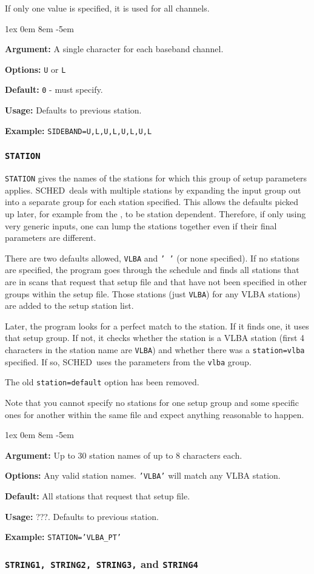 \documentclass{report}
\newcommand{\schedb}{{\sc SCHED~}}
\newcommand{\rcwbox}[5]{
  \begin{list}{}{\parsep 1ex  \itemsep 0em
                 \leftmargin 8em  \itemindent -5em }
    \item {\bf Argument:} #1
    \item {\bf Options:}  #2
    \item {\bf Default:}  #3
    \item {\bf Usage:}    #4
    \item {\bf Example:}  #5
  \end{list}
}
\begin{document}
If only one value is specified, it is used for all channels.

\rcwbox
{A single character for each baseband channel.}
{{\tt U} or {\tt L}}
{{\tt 0} - must specify.}
{Defaults to previous station.}
{{\tt SIDEBAND=U,L,U,L,U,L,U,L}}


\subsubsection{\label{SP:STATION}{\tt STATION}}

{\tt STATION} gives the names of the stations for which this group of
setup parameters applies.  \schedb deals with multiple stations by
expanding the input group out into a separate group for each
station specified.  This allows the defaults picked up later, for
example from the , to be station
dependent.  Therefore, if only using very generic inputs, one can
lump the stations together even if their final parameters are
different.

There are two defaults allowed, {\tt VLBA} and {\tt ' '} (or none
specified).  If no stations are specified, the program goes through
the schedule and finds all stations that are in scans that request
that setup file and that have not been specified in other groups
within the setup file.  Those stations (just {\tt VLBA}) for any VLBA
stations) are added to the setup station list.

Later, the program looks for a perfect match to the station.  If it
finds one, it uses that setup group.  If not, it checks whether the
station is a VLBA station (first 4 characters in the station name are
{\tt VLBA}) and whether there was a {\tt station=vlba} specified.  If
so, \schedb uses the parameters from the {\tt vlba} group.

The old {\tt station=default} option has been removed.

Note that you cannot specify no stations for one setup group and some
specific ones for another within the same file and expect anything
reasonable to happen.

\rcwbox
{Up to 30 station names of up to 8 characters each.}
{Any valid station names. {\tt 'VLBA'} will match any VLBA station.}
{All stations that request that setup file.}
{???. Defaults to previous station.}
{{\tt STATION='VLBA\_PT'}}

\subsubsection{\label{SP:STRING1}
{\tt STRING1, STRING2, STRING3,} and {\tt STRING4}}
\end{document}
